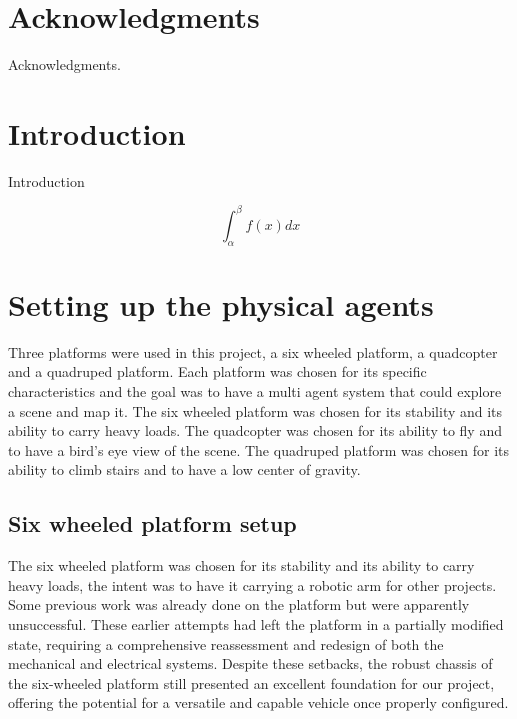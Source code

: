 \documentclass[11pt]{article}
\begin{document}
    \newpage
    \section*{Acknowledgments}

        Acknowledgments.
        
    \newpage
    \thispagestyle{empty}
    \mbox{}
    \newpage
    \thispagestyle{empty}
    {\small \tableofcontents}

    \newpage
    \thispagestyle{empty}
    \mbox{}
    \newpage
    
    \section{Introduction}
    
        Introduction    

        $$
        \int_\alpha^\beta f(x) dx
        $$
        \cite{xu2022fast}


    \newpage
    
    \section[Setting up the physical agents]{Setting up the physical agents}
    \label{section:big title}%

        Three platforms were used in this project, a six wheeled platform, a quadcopter and a quadruped platform. Each platform was chosen for its specific characteristics and the goal was to have a multi agent system that could explore a scene and map it. The six wheeled platform was chosen for its stability and its ability to carry heavy loads. The quadcopter was chosen for its ability to fly and to have a bird's eye view of the scene. The quadruped platform was chosen for its ability to climb stairs and to have a low center of gravity.

    
        \subsection{Six wheeled platform setup}

            The six wheeled platform was chosen for its stability and its ability to carry heavy loads, the intent was to have it carrying a robotic arm for other projects.
            Some previous work was already done on the platform but were apparently unsuccessful. These earlier attempts had left the platform in a partially modified state, requiring a comprehensive reassessment and redesign of both the mechanical and electrical systems. Despite these setbacks, the robust chassis of the six-wheeled platform still presented an excellent foundation for our project, offering the potential for a versatile and capable vehicle once properly configured.
\end{document}
